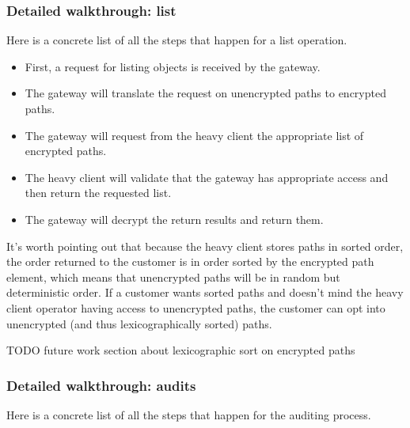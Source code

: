 \documentclass[a4paper,10pt]{article} \usepackage[utf8]{inputenc}
\newcommand{\todo}[1]{{\color{red} TODO #1 }}
\begin{document}
\subsubsection{Detailed walkthrough: list}

Here is a concrete list of all the steps that happen for a list operation.

\begin{itemize}
\item First, a request for listing objects is received by the gateway.
\item The gateway will translate the request on unencrypted paths to encrypted
  paths.
\item The gateway will request from the heavy client the appropriate list of
  encrypted paths.
\item The heavy client will validate that the gateway has appropriate access
  and then return the requested list.
\item The gateway will decrypt the return results and return them.
\end{itemize}

It's worth pointing out that because the heavy client stores paths in sorted
order, the order returned to the customer is in order sorted by the encrypted
path element, which means that unencrypted paths will be in random but
deterministic order. If a customer wants sorted paths and doesn't mind the
heavy client operator having access to unencrypted paths, the customer can opt
into unencrypted (and thus lexicographically sorted) paths.

\todo{future work section about lexicographic sort on encrypted paths}

\subsubsection{Detailed walkthrough: audits}

Here is a concrete list of all the steps that happen for the auditing process.
\end{document}
